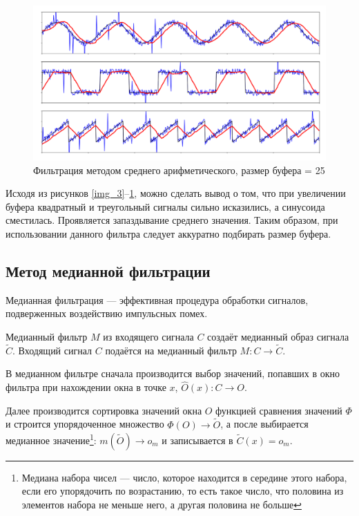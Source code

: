 \begin{figure}[h]
	\begin{center}
		\includegraphics[pages=-, scale=0.32]{./inc/img/4.png}
		\caption{Фильтрация методом среднего арифметического, размер буфера = 25}  
		\label{img_4}
	\end{center}
\end{figure}

Исходя из рисунков \ref{img_3}--\ref{img_4}, можно сделать вывод о том, что при увеличении буфера квадратный и треугольный сигналы сильно исказились, а синусоида сместилась. Проявляется запаздывание среднего значения. Таким образом, при использовании данного фильтра следует аккуратно подбирать размер буфера.

\newpage


\subsection{Метод медианной фильтрации}

Медианная фильтрация --- эффективная процедура обработки сигналов, подверженных воздействию импульсных помех. \cite{med1}

Медианный фильтр $M$ из входящего сигнала $C$ создаёт медианный образ сигнала $\widetilde{C}$.
Входящий сигнал $C$ подаётся на медианный фильтр $M:C \rightarrow \widetilde{C}$.

В медианном фильтре сначала производится выбор значений, попавших в окно фильтра при нахождении окна в точке $x$, $\hat{O}(x):C \rightarrow O$.

Далее производится сортировка значений окна $O$ функцией сравнения значений $\Phi$ и строится упорядоченное множество $\Phi(O) \rightarrow \widetilde{O}$, а после выбирается медианное значение\footnote{Медиана набора чисел --- число, которое находится в середине этого набора, если его упорядочить по возрастанию, то есть такое число, что половина из элементов набора не меньше него, а другая половина не больше}: $m(\widetilde{O}) \rightarrow o_{m}$ и записывается в $\widetilde{C}(x)= o_{m}$.

